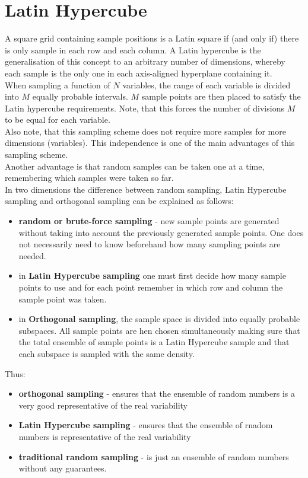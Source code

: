 \section{Latin Hypercube}
A square grid containing sample positions is a Latin square if (and only if) there is only sample in each row and each column. A Latin hypercube is the generalisation of this concept to an arbitrary number of dimensions, whereby each sample is the only one in each axis-aligned hyperplane containing it.\\
When sampling a function of $N$ variables, the range of each variable is divided into $M$ equally probable intervals. $M$ sample points are then placed to satisfy the Latin hypercube requirements. Note, that this forces the number of divisions $M$ to be equal for each variable.\\
Also note, that this sampling scheme does not require more samples for more dimensions (variables). This independence is one of the main advantages of this sampling scheme.\\
Another advantage is that random samples can be taken one at a time, remembering which samples were taken so far.\\
In two dimensions the difference between random sampling, Latin Hypercube sampling and orthogonal sampling can be explained as follows:
\begin{itemize}
	\item \textbf{\color{blue}random or brute-force sampling} - new sample points are generated without taking into account the previously generated sample points. One does not necessarily need to know beforehand how many sampling points are needed.
	\item in \textbf{\color{blue}Latin Hypercube sampling} one must first decide how many sample points to use and for each point remember in which row and column the sample point was taken.
	\item in \textbf{\color{blue}Orthogonal sampling}, the sample space is divided into equally probable subspaces. All sample points are hen chosen simultaneously making sure that the total ensemble of sample points is a Latin Hypercube sample and that each subspace is sampled with the same density.
\end{itemize}
Thus:
\begin{itemize}
	\item \textbf{\color{blue}orthogonal sampling} - ensures that the ensemble of random numbers is a very good representative of the real variability
	\item \textbf{\color{blue}Latin Hypercube sampling} - ensures that the ensemble of rnadom numbers is representative of the real variability
	\item \textbf{\color{blue}traditional random sampling} - is just an ensemble of random numbers without any guarantees.
\end{itemize}


